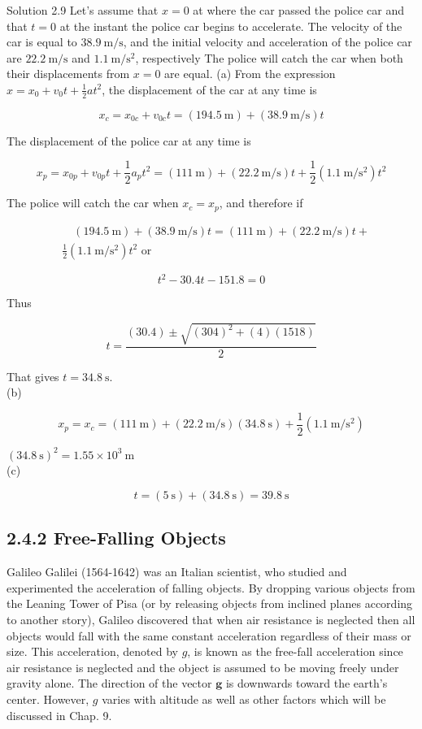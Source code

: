 \documentclass[10pt]{article}
\begin{document}
Solution 2.9 Let's assume that $x=0$ at where the car passed the police car and that $t=0$ at the instant the police car begins to accelerate. The velocity of the car is equal to $38.9 \mathrm{~m} / \mathrm{s}$, and the initial velocity and acceleration of the police car are $22.2 \mathrm{~m} / \mathrm{s}$ and $1.1 \mathrm{~m} / \mathrm{s}^{2}$, respectively The police will catch the car when both their displacements from $x=0$ are equal. (a) From the expression $x=x_{0}+v_{0} t+\frac{1}{2} a t^{2}$, the displacement of the car at any time is

$$
x_{c}=x_{0 c}+v_{0 c} t=(194.5 \mathrm{~m})+(38.9 \mathrm{~m} / \mathrm{s}) t
$$

The displacement of the police car at any time is

$$
x_{p}=x_{0 p}+v_{0 p} t+\frac{1}{2} a_{p} t^{2}=(111 \mathrm{~m})+(22.2 \mathrm{~m} / \mathrm{s}) t+\frac{1}{2}\left(1.1 \mathrm{~m} / \mathrm{s}^{2}\right) t^{2}
$$

The police will catch the car when $x_{c}=x_{p}$, and therefore if

$$
\begin{aligned}
& \quad(194.5 \mathrm{~m})+(38.9 \mathrm{~m} / \mathrm{s}) t=(111 \mathrm{~m})+(22.2 \mathrm{~m} / \mathrm{s}) t+ \\
& \frac{1}{2}\left(1.1 \mathrm{~m} / \mathrm{s}^{2}\right) t^{2} \text { or }
\end{aligned}
$$

$$
t^{2}-30.4 t-151.8=0
$$

Thus

$$
t=\frac{(30.4) \pm \sqrt{(304)^{2}+(4)(1518)}}{2}
$$

That gives $t=34.8 \mathrm{~s}$.\\
(b)

$$
x_{p}=x_{c}=(111 \mathrm{~m})+(22.2 \mathrm{~m} / \mathrm{s})(34.8 \mathrm{~s})+\frac{1}{2}\left(1.1 \mathrm{~m} / \mathrm{s}^{2}\right)
$$

$(34.8 \mathrm{~s})^{2}=1.55 \times 10^{3} \mathrm{~m}$\\
(c)

$$
t=(5 \mathrm{~s})+(34.8 \mathrm{~s})=39.8 \mathrm{~s}
$$

\subsection*{2.4.2 Free-Falling Objects}
Galileo Galilei (1564-1642) was an Italian scientist, who studied and experimented the acceleration of falling objects. By dropping various objects from the Leaning Tower of Pisa (or by releasing objects from inclined planes according to another story), Galileo discovered that when air resistance is neglected then all objects would fall with the same constant acceleration regardless of their mass or size. This acceleration, denoted by $g$, is known as the free-fall acceleration since air resistance is neglected and the object is assumed to be moving freely under gravity alone. The direction of the vector $\mathbf{g}$ is downwards toward the earth's center. However, $g$ varies with altitude as well as other factors which will be discussed in Chap. 9.
\end{document}
